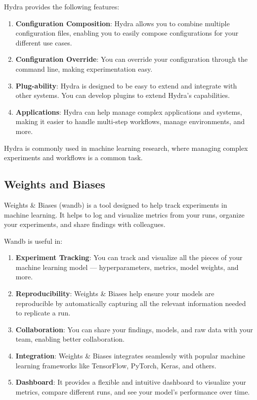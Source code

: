 Hydra provides the following features:
\begin{enumerate}
    \item \textbf{Configuration Composition}: Hydra allows you to combine multiple configuration files, enabling you to easily compose configurations for your different use cases.
    \item \textbf{Configuration Override}: You can override your configuration through the command line, making experimentation easy.
    \item \textbf{Plug-ability}: Hydra is designed to be easy to extend and integrate with other systems. You can develop plugins to extend Hydra's capabilities.
    \item \textbf{Applications}: Hydra can help manage complex applications and systems, making it easier to handle multi-step workflows, manage environments, and more.
\end{enumerate}
Hydra is commonly used in machine learning research, where managing complex experiments and workflows is a common task.

\subsection{Weights and Biases}
Weights \& Biases (wandb) is a tool designed to help track experiments in machine learning. It helps to log and visualize metrics from your runs, organize your experiments, and share findings with colleagues.

Wandb is useful in:
\begin{enumerate}
    \item \textbf{Experiment Tracking}: You can track and visualize all the pieces of your machine learning model — hyperparameters, metrics, model weights, and more.
    \item \textbf{Reproducibility}: Weights \& Biases help ensure your models are reproducible by automatically capturing all the relevant information needed to replicate a run.
    \item \textbf{Collaboration}: You can share your findings, models, and raw data with your team, enabling better collaboration.
    \item \textbf{Integration}: Weights \& Biases integrates seamlessly with popular machine learning frameworks like TensorFlow, PyTorch, Keras, and others.
    \item \textbf{Dashboard}: It provides a flexible and intuitive dashboard to visualize your metrics, compare different runs, and see your model's performance over time.
\end{enumerate}

